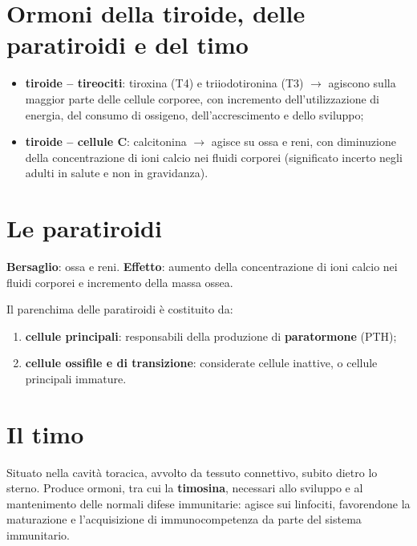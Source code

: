 \section{Ormoni della tiroide, delle paratiroidi e del timo}

\begin{itemize}
  \item \textbf{tiroide -- tireociti}: tiroxina (T4) e triiodotironina
    (T3) $\rightarrow$ agiscono sulla maggior parte delle cellule
    corporee, con incremento dell'utilizzazione di energia, del consumo di
    ossigeno, dell'accrescimento e dello sviluppo;
  \item \textbf{tiroide -- cellule C}: calcitonina $\rightarrow$ agisce su
    ossa e reni, con diminuzione della concentrazione di ioni calcio nei
    fluidi corporei (significato incerto negli adulti in salute e non in
    gravidanza).
\end{itemize}

\section{Le paratiroidi}

\textbf{Bersaglio}: ossa e reni. \textbf{Effetto}: aumento della
concentrazione di ioni calcio nei fluidi corporei e incremento della massa
ossea.

Il parenchima delle paratiroidi è costituito da:
\begin{enumerate}
  \item \textbf{cellule principali}: responsabili della produzione di
    \textbf{paratormone} (PTH);
  \item \textbf{cellule ossifile e di transizione}: considerate cellule
    inattive, o cellule principali immature.
\end{enumerate}

\section{Il timo}

Situato nella cavità toracica, avvolto da tessuto connettivo, subito dietro
lo sterno. Produce ormoni, tra cui la \textbf{timosina}, necessari allo
sviluppo e al mantenimento delle normali difese immunitarie: agisce sui
linfociti, favorendone la maturazione e l'acquisizione di
immunocompetenza da parte del sistema immunitario.

